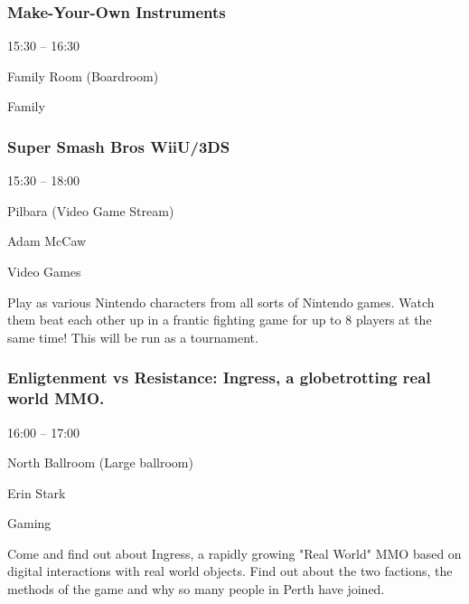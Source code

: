 \documentclass{scrreprt}
\begin{document}
\begin{multicols}{2}
\subsubsection*{Make-Your-Own Instruments}\begin{description}
\setlength{\itemsep}{0pt}
\setlength{\parsep}{0pt}
\setlength{\parskip}{0pt}
\item[Time:]{15:30 -- 16:30}
\item[Venue:]{Family Room (Boardroom)}
\item[Tags:]{Family}\end{description}

\subsubsection*{Super Smash Bros WiiU/3DS}\begin{description}
\setlength{\itemsep}{0pt}
\setlength{\parsep}{0pt}
\setlength{\parskip}{0pt}
\item[Time:]{15:30 -- 18:00}
\item[Venue:]{Pilbara (Video Game Stream)}
\item[People:]{Adam McCaw}
\item[Tags:]{Video Games}\end{description}
Play as various Nintendo characters from all sorts of Nintendo games. Watch them beat each other up in a frantic fighting game for up to 8 players at the same time! This will be run as a tournament.
\subsubsection*{Enligtenment vs Resistance: Ingress, a globetrotting real world MMO.}\begin{description}
\setlength{\itemsep}{0pt}
\setlength{\parsep}{0pt}
\setlength{\parskip}{0pt}
\item[Time:]{16:00 -- 17:00}
\item[Venue:]{North Ballroom (Large ballroom)}
\item[People:]{Erin Stark}
\item[Tags:]{Gaming}\end{description}
Come and find out about Ingress, a rapidly growing "Real World" MMO based on digital interactions with real world objects. Find out about the two factions, the methods of the game and why so many people in Perth have joined.

\end{multicols}
\end{document}
